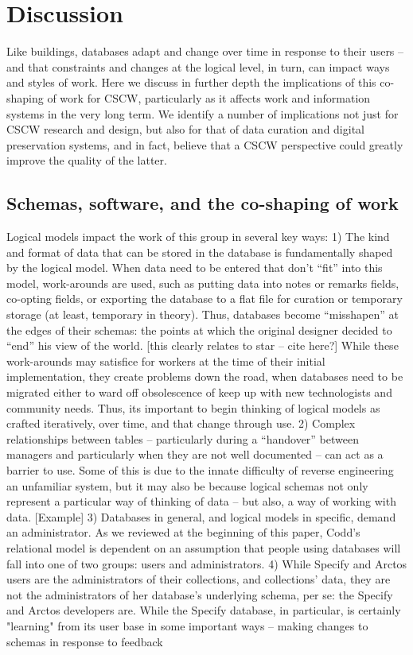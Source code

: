 \section{Discussion}

Like buildings, databases adapt and change over time in response to their users -- and that constraints and changes at the logical level, in turn, can impact ways and styles of work.  Here we discuss in further depth the implications of this co-shaping of work for CSCW, particularly as it affects work and information systems in the very long term.  We identify a number of implications not just for CSCW research and design, but also for that of data curation and digital preservation systems, and in fact, believe that a CSCW perspective could greatly improve the quality of the latter.

\subsection{Schemas, software, and the co-shaping of work}

Logical models impact the work of this group in several key ways: 
1)	The kind and format of data that can be stored in the database is fundamentally shaped by the logical model. When data need to be entered that don’t “fit” into this model, work-arounds are used, such as putting data into notes or remarks fields, co-opting fields, or exporting the database to a flat file for curation or temporary storage (at least, temporary in theory). Thus, databases become “misshapen” at the edges of their schemas: the points at which the original designer decided to “end” his view of the world. [this clearly relates to star – cite here?] While these work-arounds may satisfice for workers at the time of their initial implementation, they create problems down the road, when databases need to be migrated either to ward off obsolescence of keep up with new technologists and community needs.  Thus, its important to begin thinking of logical models as crafted iteratively, over time, and that change through use.
2)	Complex relationships between tables – particularly during a “handover” between managers and particularly when they are not well documented – can act as a barrier to use.  Some of this is due to the innate difficulty of reverse engineering an unfamiliar system, but it may also be because logical schemas not only represent a particular way of thinking of data – but also, a way of working with data. [Example]
3)	Databases in general, and logical models in specific, demand an administrator. As we reviewed at the beginning of this paper, Codd’s relational model is dependent on an assumption that people using databases will fall into one of two groups: users and administrators. 
4)	While Specify and Arctos users are the administrators of their collections, and collections’ data, they are not the administrators of her database's underlying schema, per se: the Specify and Arctos developers are.  While the Specify database, in particular, is certainly "learning" from its user base in some important ways – making changes to schemas in response to feedback   



